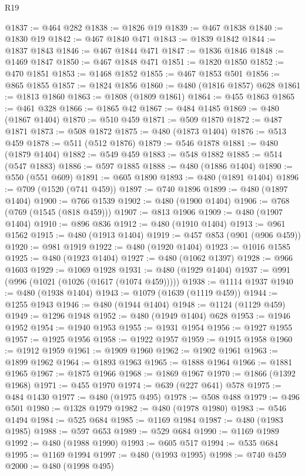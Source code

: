 \begin{lexlean}{R19}
\begin{coremodule}
@1837 := @464 @282
@1838 := @1826 @19
@1839 := @467 @1838
@1840 := @1830 @19
@1842 := @467 @1840 @471
@1843 := @1839 @1842
@1844 := @1837 @1843
@1846 := @467 @1844 @471
@1847 := @1836 @1846
@1848 := @1469 @1847
@1850 := @467 @1848 @471
@1851 := @1820 @1850
@1852 := @470 @1851
@1853 := @1468 @1852
@1855 := @467 @1853 @501
@1856 := @865 @1855
@1857 := @1824 @1856
@1860 := @480 (@1816 @1857) @628
@1861 := @1813 @1860
@1863 := @1808 (@1809 @1861)
@1864 := @455 @1863
@1865 := @461 @328
@1866 := @1865 @42
@1867 := @484 @1485
@1869 := @480 (@1867 @1404)
@1870 := @510 @459
@1871 := @509 @1870
@1872 := @487 @1871
@1873 := @508 @1872
@1875 := @480 (@1873 @1404)
@1876 := @513 @459
@1878 := @511 (@512 @1876)
@1879 := @546 @1878
@1881 := @480 (@1879 @1404)
@1882 := @549 @459
@1883 := @548 @1882
@1885 := @514 (@547 @1883)
@1886 := @597 @1885
@1888 := @480 (@1886 @1404)
@1890 := @550 (@551 @609)
@1891 := @605 @1890
@1893 := @480 (@1891 @1404)
@1896 := @709 (@1520 (@741 @459))
@1897 := @740 @1896
@1899 := @480 (@1897 @1404)
@1900 := @766 @1539
@1902 := @480 (@1900 @1404)
@1906 := @768 (@769 (@1545 (@818 @459)))
@1907 := @813 @1906
@1909 := @480 (@1907 @1404)
@1910 := @896 @836
@1912 := @480 (@1910 @1404)
@1913 := @961 @1562
@1915 := @480 (@1913 @1404)
@1919 := @457 @853 (@901 (@906 @459))
@1920 := @981 @1919
@1922 := @480 (@1920 @1404)
@1923 := @1016 @1585
@1925 := @480 (@1923 @1404)
@1927 := @480 (@1062 @1397)
@1928 := @966 @1603
@1929 := @1069 @1928
@1931 := @480 (@1929 @1404)
@1937 := @991 (@996 (@1021 (@1026 (@1617 (@1074 @459)))))
@1938 := @1114 @1937
@1940 := @480 (@1938 @1404)
@1943 := @1079 (@1639 (@1119 @459))
@1944 := @1255 @1943
@1946 := @480 (@1944 @1404)
@1948 := @1124 (@1129 @459)
@1949 := @1296 @1948
@1952 := @480 (@1949 @1404) @628
@1953 := @1946 @1952
@1954 := @1940 @1953
@1955 := @1931 @1954
@1956 := @1927 @1955
@1957 := @1925 @1956
@1958 := @1922 @1957
@1959 := @1915 @1958
@1960 := @1912 @1959
@1961 := @1909 @1960
@1962 := @1902 @1961
@1963 := @1899 @1962
@1964 := @1893 @1963
@1965 := @1888 @1964
@1966 := @1881 @1965
@1967 := @1875 @1966
@1968 := @1869 @1967
@1970 := @1866 (@1392 @1968)
@1971 := @455 @1970
@1974 := @639 (@227 @641) @578
@1975 := @484 @1430
@1977 := @480 (@1975 @495)
@1978 := @508 @488
@1979 := @496 @501
@1980 := @1328 @1979
@1982 := @480 (@1978 @1980)
@1983 := @546 @1494
@1984 := @525 @684
@1985 := @1169 @1984
@1987 := @480 (@1983 @1985)
@1988 := @597 @653
@1989 := @529 @684
@1990 := @1169 @1989
@1992 := @480 (@1988 @1990)
@1993 := @605 @517
@1994 := @535 @684
@1995 := @1169 @1994
@1997 := @480 (@1993 @1995)
@1998 := @740 @459
@2000 := @480 (@1998 @495)

\end{coremodule}
\end{lexlean}
